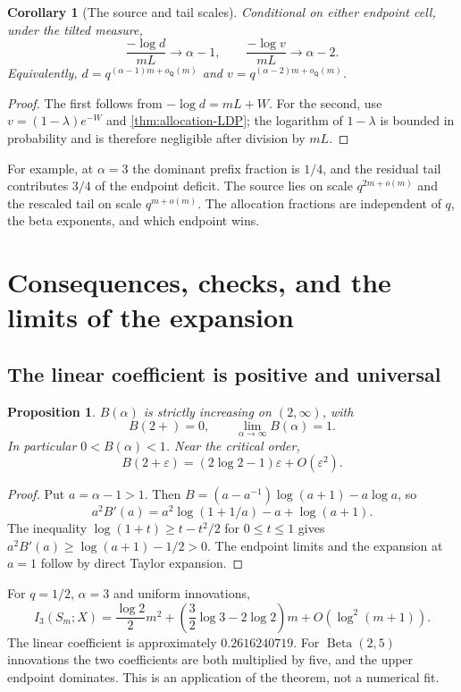\documentclass[11pt,a4paper]{article}
\numberwithin{equation}{section}
\newtheorem{proposition}[proposition]{Proposition}
\newtheorem{corollary}[corollary]{Corollary}
\theoremstyle{definition}\newaliascnt{definition}{theorem}
\theoremstyle{remark}\newaliascnt{remark}{theorem}
\newcommand{\eps}{\varepsilon}
\begin{document}
\begin{corollary}[The source and tail scales]
\label{cor:scales}
Conditional on either endpoint cell, under the tilted measure,
\begin{equation}
 \frac{-\log d}{mL}\to\alpha-1,
 \qquad \frac{-\log v}{mL}\to\alpha-2.
 \label{eq:scales}
\end{equation}
Equivalently,
$d=q^{(\alpha-1)m+o_{\mathsf Q}(m)}$ and
$v=q^{(\alpha-2)m+o_{\mathsf Q}(m)}$.
\end{corollary}
\begin{proof}
The first follows from $-\log d=mL+W$. For the second, use
$v=(1-\lambda)e^{-W}$ and \cref{thm:allocation-LDP}; the logarithm of
$1-\lambda$ is bounded in probability and is therefore negligible after
division by $mL$.
\end{proof}
For example, at $\alpha=3$ the dominant prefix fraction is $1/4$, and the
residual tail contributes $3/4$ of the endpoint deficit. The source lies
on scale $q^{2m+o(m)}$ and the rescaled tail on scale $q^{m+o(m)}$.
The allocation fractions are independent of $q$, the beta exponents, and
which endpoint wins.

\section{Consequences, checks, and the limits of the expansion}
\label{sec:consequences}

\subsection{The linear coefficient is positive and universal}
\begin{proposition}
$B(\alpha)$ is strictly increasing on $(2,\infty)$, with
\begin{equation}
 B(2+)=0,\qquad \lim_{\alpha\to\infty}B(\alpha)=1.
 \label{eq:B-limits}
\end{equation}
In particular $0<B(\alpha)<1$. Near the critical order,
\begin{equation}
 B(2+\eps)=(2\log2-1)\eps+O(\eps^2).
 \label{eq:B-near2}
\end{equation}
\end{proposition}
\begin{proof}
Put $a=\alpha-1>1$. Then
$B=(a-a^{-1})\log(a+1)-a\log a$, so
\[
 a^2B'(a)=a^2\log(1+1/a)-a+\log(a+1).
\]
The inequality $\log(1+t)\ge t-t^2/2$ for $0\le t\le1$ gives
$a^2B'(a)\ge\log(a+1)-1/2>0$. The endpoint limits and the expansion at
$a=1$ follow by direct Taylor expansion.
\end{proof}
For $q=1/2$, $\alpha=3$ and uniform innovations,
\begin{equation}
 I_3(S_m;X)=\frac{\log2}{2}m^2
       +\left(\frac32\log3-2\log2\right)m+O(\log^2(m+1)).
 \label{eq:alpha3}
\end{equation}
The linear coefficient is approximately $0.2616240719$. For
$\operatorname{Beta}(2,5)$ innovations the two coefficients are both
multiplied by five, and the upper endpoint dominates. This is an application
of the theorem, not a numerical fit.
\end{document}
